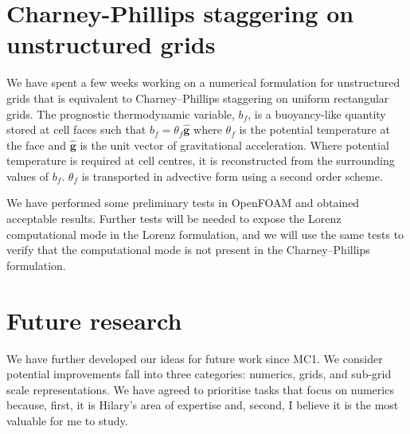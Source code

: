 \documentclass[a4paper]{article}
\begin{document}
\section{Charney-Phillips staggering on unstructured grids}
We have spent a few weeks working on a numerical formulation for unstructured grids that is equivalent to Charney--Phillips staggering on uniform rectangular grids.  The prognostic thermodynamic variable, $b_f$, is a buoyancy-like quantity stored at cell faces such that $b_f = \theta_f \bm{\hat{g}}$ where $\theta_f$ is the potential temperature at the face and $\bm{\hat{g}}$ is the unit vector of gravitational acceleration.  Where potential temperature is required at cell centres, it is reconstructed from the surrounding values of $b_f$.  $\theta_f$ is transported in advective form using a second order scheme.

We have performed some preliminary tests in OpenFOAM and obtained acceptable results.  Further tests will be needed to expose the Lorenz computational mode in the Lorenz formulation, and we will use the same tests to verify that the computational mode is not present in the Charney--Phillips formulation.

\section{Future research}
We have further developed our ideas for future work since MC1.  We consider potential improvements fall into three categories: numerics, grids, and sub-grid scale representations.  We have agreed to prioritise tasks that focus on numerics because, first, it is Hilary's area of expertise and, second, I believe it is the most valuable for me to study.
\end{document}
